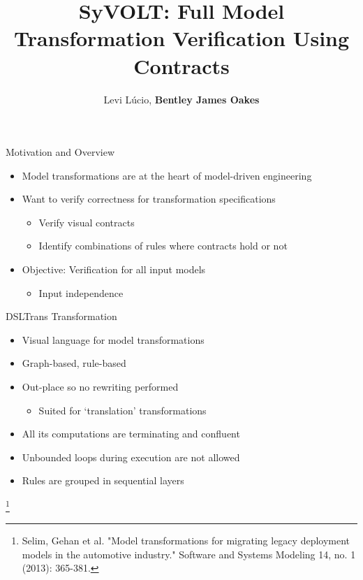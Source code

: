 \documentclass[xcolor=dvipsnames, 12pt, handout]{beamer}
\title[SyVOLT]{SyVOLT: Full Model Transformation Verification Using Contracts}
\author[Lucio, Oakes]{Levi L\'{u}cio, \textbf{Bentley James Oakes}}
\institute[]{McGill University, Canada\\fortiss, Munich}
\newcommand\blfootnote[1]{%
  \begingroup
  \renewcommand\thefootnote{}\footnote{#1}%
  \addtocounter{footnote}{-1}%
  \endgroup
}
\begin{document}
\maketitle


\begin{frame}{Motivation and Overview}
\begin{itemize}[<+->]
\item Model transformations are at the heart of model-driven engineering
\item Want to verify correctness for transformation specifications
\begin{itemize}[<+->]
\item Verify visual contracts
\item Identify combinations of rules where contracts hold or not
\end{itemize}
\item Objective: Verification for all input models
\begin{itemize}
\item Input independence
\end{itemize}
\end{itemize}
\end{frame}






\begin{frame}{DSLTrans Transformation}

\begin{itemize}[<+->]
\item Visual language for model transformations

\item Graph-based, rule-based
\item Out-place so no rewriting performed
\begin{itemize}
\item Suited for `translation' transformations
\end{itemize}
\item All its computations are terminating and confluent
\item Unbounded loops during execution are not allowed

\item Rules are grouped in sequential layers
\end{itemize}

\blfootnote{Selim, Gehan et al. "Model transformations for migrating legacy deployment models in the automotive industry." Software and Systems Modeling 14, no. 1 (2013): 365-381.}

\end{frame}
\end{document}
